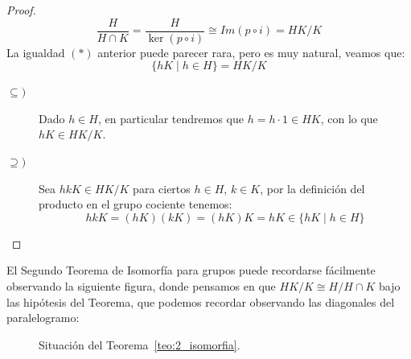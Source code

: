 \begin{teo}
\begin{proof}
        \begin{equation*}
            \dfrac{H}{H\cap K} = \dfrac{H}{\ker(p\circ i)} \cong Im(p\circ i) = HK/K
        \end{equation*}
        La igualdad $(\ast)$ anterior puede parecer rara, pero es muy natural, veamos que:
        \begin{equation*}
            \{hK\mid h \in H\} = HK/K
        \end{equation*}
        \begin{description}
            \item [$\subseteq)$] Dado $h\in H$, en particular tendremos que $h = h\cdot 1 \in HK$, con lo que ${hK \in HK/K}$.
            \item [$\supseteq)$] Sea $hkK\in HK/K$ para ciertos $h\in H$, $k\in K$, por la definición del producto en el grupo cociente tenemos:
                \begin{equation*}
                    hkK = (hK)(kK) = (hK)K = hK \in \{hK \mid h\in H\}
                \end{equation*} \qedhere
        \end{description}
    \end{proof}
\end{teo}

\noindent
El Segundo Teorema de Isomorfía para grupos puede recordarse fácilmente observando la siguiente figura, donde pensamos en que $HK/K\cong H/H\cap K$ bajo las hipótesis del Teorema, que podemos recordar observando las diagonales del paralelogramo:
\begin{figure}[H]
    \centering
    \caption{Situación del Teorema~\ref{teo:2_isomorfia}.}
    \label{fig:teo_2_isomorfia}
\end{figure}

